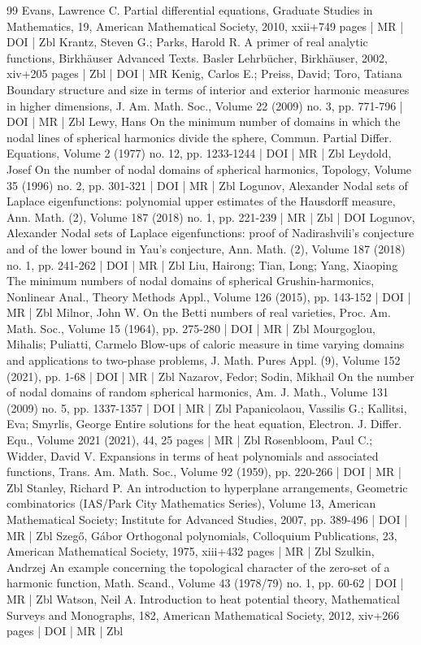 \documentclass[10pt]{amsart}
\theoremstyle{definition}\newtheorem{defi}[theo]{Definition}\newtheorem{rema}[theo]{Remark}\newtheorem{exam}[theo]{Example}\newtheorem{exem}[theo]{Example}\newtheorem{nota}[theo]{Notation}
\begin{document}
\begin{thebibliography}{99}
Evans, Lawrence C. Partial differential equations, Graduate Studies in Mathematics, 19, American Mathematical Society, 2010, xxii+749 pages | MR | DOI | Zbl
Krantz, Steven G.; Parks, Harold R. A primer of real analytic functions, Birkhäuser Advanced Texts. Basler Lehrbücher, Birkhäuser, 2002, xiv+205 pages | Zbl | DOI | MR
Kenig, Carlos E.; Preiss, David; Toro, Tatiana Boundary structure and size in terms of interior and exterior harmonic measures in higher dimensions, J. Am. Math. Soc., Volume 22 (2009) no. 3, pp. 771-796 | DOI | MR | Zbl
Lewy, Hans On the minimum number of domains in which the nodal lines of spherical harmonics divide the sphere, Commun. Partial Differ. Equations, Volume 2 (1977) no. 12, pp. 1233-1244 | DOI | MR | Zbl
Leydold, Josef On the number of nodal domains of spherical harmonics, Topology, Volume 35 (1996) no. 2, pp. 301-321 | DOI | MR | Zbl
Logunov, Alexander Nodal sets of Laplace eigenfunctions: polynomial upper estimates of the Hausdorff measure, Ann. Math. (2), Volume 187 (2018) no. 1, pp. 221-239 | MR | Zbl | DOI
Logunov, Alexander Nodal sets of Laplace eigenfunctions: proof of Nadirashvili’s conjecture and of the lower bound in Yau’s conjecture, Ann. Math. (2), Volume 187 (2018) no. 1, pp. 241-262 | DOI | MR | Zbl
Liu, Hairong; Tian, Long; Yang, Xiaoping The minimum numbers of nodal domains of spherical Grushin-harmonics, Nonlinear Anal., Theory Methods Appl., Volume 126 (2015), pp. 143-152 | DOI | MR | Zbl
Milnor, John W. On the Betti numbers of real varieties, Proc. Am. Math. Soc., Volume 15 (1964), pp. 275-280 | DOI | MR | Zbl
Mourgoglou, Mihalis; Puliatti, Carmelo Blow-ups of caloric measure in time varying domains and applications to two-phase problems, J. Math. Pures Appl. (9), Volume 152 (2021), pp. 1-68 | DOI | MR | Zbl
Nazarov, Fedor; Sodin, Mikhail On the number of nodal domains of random spherical harmonics, Am. J. Math., Volume 131 (2009) no. 5, pp. 1337-1357 | DOI | MR | Zbl
Papanicolaou, Vassilis G.; Kallitsi, Eva; Smyrlis, George Entire solutions for the heat equation, Electron. J. Differ. Equ., Volume 2021 (2021), 44, 25 pages | MR | Zbl
Rosenbloom, Paul C.; Widder, David V. Expansions in terms of heat polynomials and associated functions, Trans. Am. Math. Soc., Volume 92 (1959), pp. 220-266 | DOI | MR | Zbl
Stanley, Richard P. An introduction to hyperplane arrangements, Geometric combinatorics (IAS/Park City Mathematics Series), Volume 13, American Mathematical Society; Institute for Advanced Studies, 2007, pp. 389-496 | DOI | MR | Zbl
Szegő, Gábor Orthogonal polynomials, Colloquium Publications, 23, American Mathematical Society, 1975, xiii+432 pages | MR | Zbl
Szulkin, Andrzej An example concerning the topological character of the zero-set of a harmonic function, Math. Scand., Volume 43 (1978/79) no. 1, pp. 60-62 | DOI | MR | Zbl
Watson, Neil A. Introduction to heat potential theory, Mathematical Surveys and Monographs, 182, American Mathematical Society, 2012, xiv+266 pages | DOI | MR | Zbl
\end{thebibliography}
\end{document}
